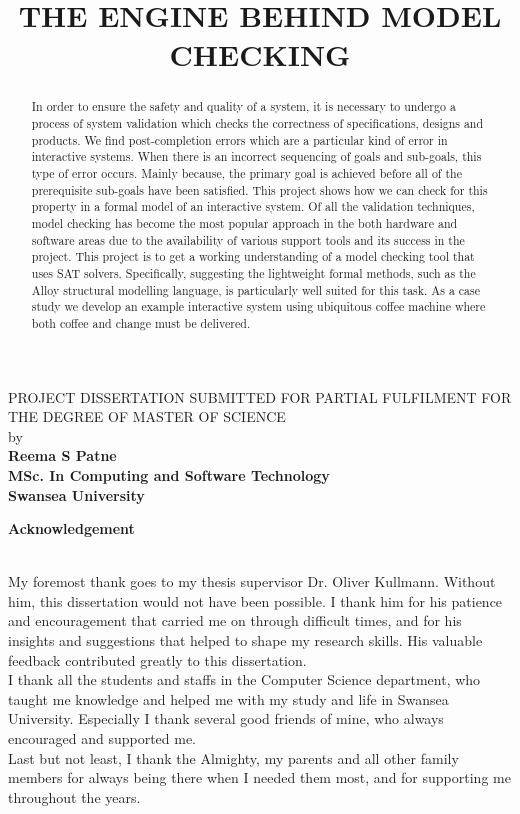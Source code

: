 \documentclass[a4paper,12pt]{extarticle}
\begin{document}
\title{THE ENGINE BEHIND MODEL CHECKING}
\maketitle
\begin{center}
\textsf{
PROJECT DISSERTATION SUBMITTED FOR PARTIAL FULFILMENT FOR THE DEGREE OF MASTER OF SCIENCE \\ by \\ 
}
\textbf{Reema S Patne \\ MSc. In Computing and Software Technology \\ Swansea University}
\end{center}
\newpage  
\begin{abstract}
\textsf{In order to ensure the safety and quality of a system, it is necessary to undergo a process of system validation which checks the correctness of specifications, designs and products.\cite{Berardetall2001} We find post-completion errors which are a particular kind of error in interactive systems. When there is an incorrect sequencing of goals and sub-goals, this type of error occurs. Mainly because, the primary goal is achieved before all of the prerequisite sub-goals have been satisfied. This project shows how we can check for this property in a formal model of an interactive system. Of all the validation techniques, model checking has become the most popular approach in the both hardware and software areas due to the availability of various support tools and its success in the project. This project is to get a working understanding of a model checking tool that uses SAT solvers. Specifically, suggesting the lightweight formal methods, such as the Alloy structural modelling language, is particularly well suited for this task. As a case study we develop an example interactive system using ubiquitous coffee machine where both coffee and change must be delivered.}
\end{abstract}
\newpage
\begin{center}
\textbf{Acknowledgement\\}
\end{center}
\textsf{ \\ My foremost thank goes to my thesis supervisor Dr. Oliver Kullmann. Without him, this dissertation would not have been possible. I thank him for his patience and encouragement that carried me on through difficult times, and for his insights and suggestions that helped to shape my research skills. His valuable feedback contributed greatly to this dissertation.\\ I thank all the students and staffs in the Computer Science department, who taught me knowledge and helped me with my study and life in Swansea University. Especially I thank several good friends of mine, who always encouraged and supported me.\\ Last but not least, I thank the Almighty, my parents and all other family members for always being there when I needed them most, and for supporting me throughout the years.}
\end{document}
